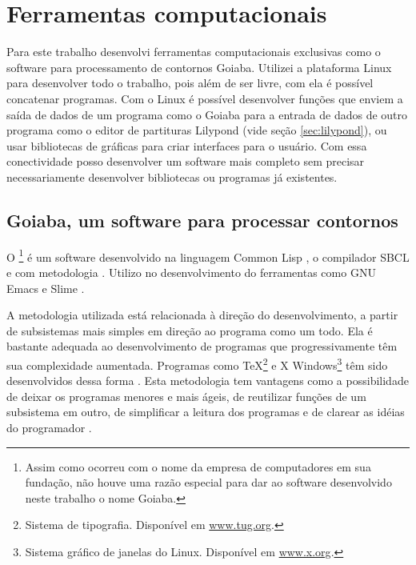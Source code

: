 \chapter{Ferramentas computacionais}
\label{cha:ferramentas}

Para este trabalho desenvolvi ferramentas computacionais exclusivas
como o software para processamento de contornos Goiaba. Utilizei a
plataforma Linux para desenvolver todo o trabalho, pois além de ser
livre, com ela é possível concatenar programas. Com o Linux é possível
desenvolver funções que enviem a saída de dados de um programa como o
Goiaba para a entrada de dados de outro programa como o editor de
partituras Lilypond (vide seção \ref{sec:lilypond}), ou usar
bibliotecas de gráficas para criar interfaces para o usuário. Com essa
conectividade posso desenvolver um software mais completo sem precisar
necessariamente desenvolver bibliotecas ou programas já existentes.

\section{Goiaba, um software para processar contornos}
\label{sec:goiaba-software-para}

O \goiaba{}\footnote{Assim como ocorreu com o nome da empresa de
  computadores  em sua fundação, não houve uma razão
  especial para dar ao software desenvolvido neste trabalho o nome
  Goiaba.} é um software desenvolvido na linguagem Common Lisp
\cite{graham94:lisp,seibel05:practical,shapiro92:common}, o compilador
SBCL \cite{team07:sbcl} e com metodologia . Utilizo no
desenvolvimento do \goiaba{} ferramentas como GNU Emacs
\cite{stallman07:gnu} e Slime \cite{team05:slime}.

A metodologia  utilizada está relacionada à direção do
desenvolvimento, a partir de subsistemas mais simples em direção ao
programa como um todo. Ela é bastante adequada ao desenvolvimento de
programas que progressivamente têm sua complexidade
aumentada. Programas como \TeX{}\footnote{Sistema de
  tipografia. Disponível em \url{www.tug.org}.} e X
Windows\footnote{Sistema gráfico de janelas do Linux. Disponível em
  \url{www.x.org}.} têm sido desenvolvidos dessa forma
\cite[p. vi]{graham94:lisp}. Esta metodologia tem vantagens como a
possibilidade de deixar os programas menores e mais ágeis, de
reutilizar funções de um subsistema em outro, de simplificar a leitura
dos programas e de clarear as idéias do programador
\cite[p. 4]{graham94:lisp}.


